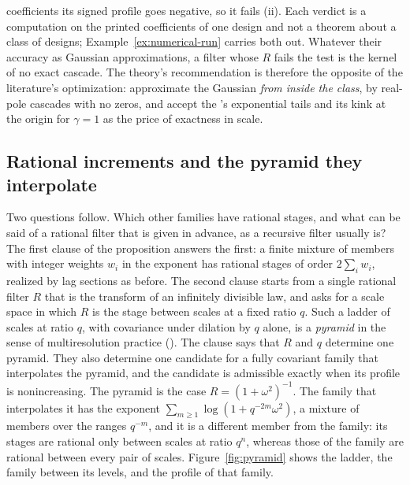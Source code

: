 \begin{remark}
coefficients its signed profile goes negative, so it fails (ii). Each verdict is a computation on
the printed coefficients of one design and not a theorem about a class of designs;
Example~\ref{ex:numerical-run} carries both out. Whatever their accuracy as Gaussian
approximations, a filter whose $R$ fails the test is the kernel of no exact cascade. The theory's
recommendation is therefore the opposite of the literature's optimization: approximate the
Gaussian \emph{from inside the class}, by real-pole cascades with no zeros, and accept the
\Matern{}'s exponential tails and its kink at the origin for $\gamma = 1$ as the price of
exactness in scale.
\end{remark}

\subsection{Rational increments and the pyramid they interpolate}\label{sec:rational}

Two questions follow. Which other families have rational stages, and what can be said of a
rational filter that is given in advance, as a recursive filter usually is? The first clause
of the proposition answers the first: a finite mixture of \Matern{} members with integer
weights $w_i$ in the exponent has rational stages of order $2\sum_i w_i$, realized by lag
sections as before. The
second clause starts from a single rational filter $R$ that is the transform of an infinitely
divisible law, and asks for a scale space in which $R$ is the stage between scales at a fixed
ratio $q$. Such a ladder of scales at ratio $q$, with covariance under dilation by $q$ alone,
is a \emph{pyramid} in the sense of multiresolution practice (). The
clause says that $R$ and $q$ determine one pyramid. They also determine one candidate for a
fully covariant family that interpolates the pyramid, and the candidate is admissible exactly
when its profile is nonincreasing. The \Matern{} pyramid is the case $R = (1+\omega^2)^{-1}$.
The family that interpolates it has the exponent $\sum_{m \ge 1}\log(1 + q^{-2m}\omega^2)$, a
mixture of \Matern{} members over the ranges $q^{-m}$, and it is a different member from the
\Matern{} family: its stages are rational only between scales at ratio $q^n$, whereas those of
the \Matern{} family are rational between every pair of scales. Figure~\ref{fig:pyramid} shows
the ladder, the family between its levels, and the profile of that family.



